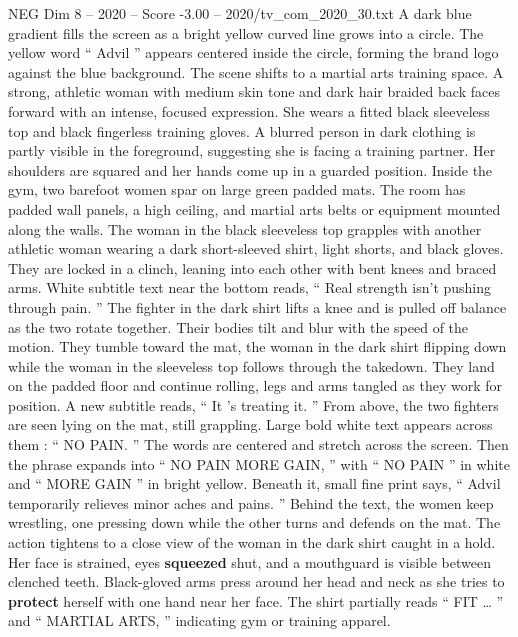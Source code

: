 \begin{textsample}{NEG Dim 8 – 2020 – Score -3.00 – 2020/tv\_com\_2020\_30.txt}  \label{ex:f8_neg_049}
A dark blue gradient fills the screen as a bright yellow curved line grows into a circle.
The yellow word “ Advil ” appears centered inside the circle, forming the brand logo against the blue background.
The scene shifts to a martial arts training space.
A strong, athletic woman with medium skin tone and dark hair braided back faces forward with an intense, focused expression.
She wears a fitted black sleeveless top and black fingerless training gloves.
A blurred person in dark clothing is partly visible in the foreground, suggesting she is facing a training partner.
Her shoulders are squared and her hands come up in a guarded position.
Inside the gym, two barefoot women spar on large green padded mats.
The room has padded wall panels, a high ceiling, and martial arts belts or equipment mounted along the walls.
The woman in the black sleeveless top grapples with another athletic woman wearing a dark short-sleeved shirt, light shorts, and black gloves.
They are locked in a clinch, leaning into each other with bent knees and braced arms.
White subtitle text near the bottom reads, “ Real strength isn't pushing through pain. ” The fighter in the dark shirt lifts a knee and is pulled off balance as the two rotate together.
Their bodies tilt and blur with the speed of the motion.
They tumble toward the mat, the woman in the dark shirt flipping down while the woman in the sleeveless top follows through the takedown.
They land on the padded floor and continue rolling, legs and arms tangled as they work for position.
A new subtitle reads, “ It ’s treating it. ” From above, the two fighters are seen lying on the mat, still grappling.
Large bold white text appears across them : “ NO PAIN. ” The words are centered and stretch across the screen.
Then the phrase expands into “ NO PAIN MORE GAIN, ” with “ NO PAIN ” in white and “ MORE GAIN ” in bright yellow.
Beneath it, small fine print says, “ Advil temporarily relieves minor aches and pains. ” Behind the text, the women keep wrestling, one pressing down while the other turns and defends on the mat.
The action tightens to a close view of the woman in the dark shirt caught in a hold.
Her face is strained, eyes \textbf{squeezed} shut, and a mouthguard is visible between clenched teeth.
Black-gloved arms press around her head and neck as she tries to \textbf{protect} herself with one hand near her face.
The shirt partially reads “ FIT … ” and “ MARTIAL ARTS, ” indicating gym or training apparel.

\end{textsample}
